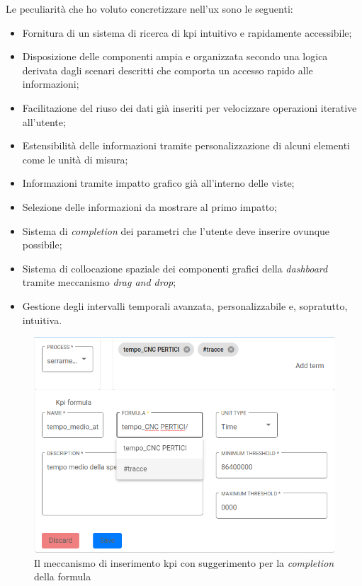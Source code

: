 Le peculiarità che ho voluto concretizzare nell'\acrshort{ux} sono le seguenti:
\begin{itemize}
    \item Fornitura di un sistema di ricerca di \acrshort{kpi} intuitivo e rapidamente accessibile;
    \item Disposizione delle componenti ampia e organizzata secondo una logica derivata dagli scenari descritti che comporta un accesso rapido alle informazioni;
    \item Facilitazione del riuso dei dati già inseriti per velocizzare operazioni iterative all'utente;
    \item Estensibilità delle informazioni tramite personalizzazione di alcuni elementi come le unità di misura;
    \item Informazioni tramite impatto grafico già all'interno delle viste;
    \item Selezione delle informazioni da mostrare al primo impatto;
    \item Sistema di \textit{completion} dei parametri che l'utente deve inserire ovunque possibile;
    \item Sistema di collocazione spaziale dei componenti grafici della \textit{dashboard} tramite meccanismo \textit{drag and drop};
    \item Gestione degli intervalli temporali avanzata, personalizzabile e, sopratutto, intuitiva.
\end{itemize}
\begin{figure}[H]
    \centering
    \includegraphics[width=\columnwidth]{immagini/formula_completion.png}
    \caption{Il meccanismo di inserimento kpi con suggerimento per la \textit{completion} della formula}
    \label{fig:formulaCompletion}
\end{figure}
